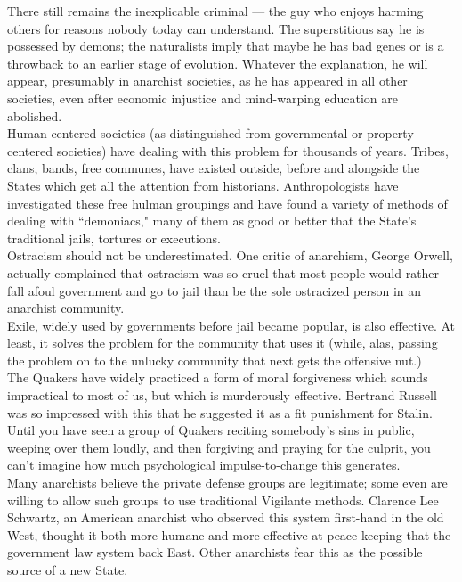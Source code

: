 There still remains the inexplicable criminal --- the guy who enjoys harming others for reasons nobody today can understand. The superstitious say he is possessed by demons; the naturalists imply that maybe he has bad genes or is a throwback to an earlier stage of evolution. Whatever the explanation, he will appear, presumably in anarchist societies, as he has appeared in all other societies, even after economic injustice and mind-warping education are abolished.\\
Human-centered societies (as distinguished from governmental or property-centered societies) have dealing with this problem for thousands of years. Tribes, clans, bands, free communes, have existed outside, before and alongside the States which get all the attention from historians. Anthropologists have investigated these free hulman groupings and have found a variety of methods of dealing with ``demoniacs," many of them as good or better that the State's traditional jails, tortures or executions.\\
Ostracism should not be underestimated. One critic of anarchism, George Orwell, actually complained that ostracism was so cruel that most people would rather fall afoul government and go to jail than be the sole ostracized person in an anarchist community.\\
Exile, widely used by governments before jail became popular, is also effective. At least, it solves the problem for the community that uses it (while, alas, passing the problem on to the unlucky community that next gets the offensive nut.)\\
The Quakers have widely practiced a form of moral forgiveness which sounds impractical to most of us, but which is murderously effective. Bertrand Russell was so impressed with this that he suggested it as a fit punishment for Stalin. Until you have seen a group of Quakers reciting somebody's sins in public, weeping over them loudly, and then forgiving and praying for the culprit, you can't imagine how much psychological impulse-to-change this generates.\\
Many anarchists believe the private defense groups are legitimate; some even are willing to allow such groups to use traditional Vigilante methods. Clarence Lee Schwartz, an American anarchist who observed this system first-hand in the old West, thought it both more humane and more effective at peace-keeping that the government law system back East. Other anarchists fear this as the possible source of a new State.\\
